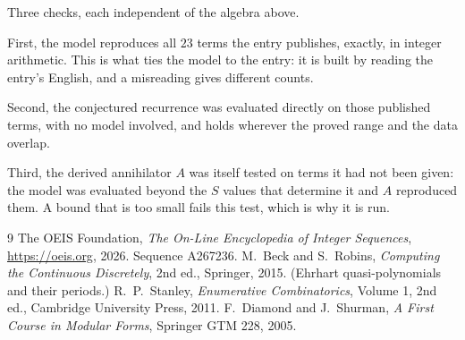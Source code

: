 \documentclass[11pt,a4paper]{article}
\theoremstyle{plain}
\theoremstyle{definition}
\begin{document}
Three checks, each independent of the algebra above.

First, the model reproduces all $23$ terms the entry publishes, exactly, in integer
arithmetic. This is what ties the model to the entry: it is built by reading the entry's
English, and a misreading gives different counts.

Second, the conjectured recurrence was evaluated directly on those published terms, with no
model involved, and holds wherever the proved range and the data overlap.

Third, the derived annihilator $A$ was itself tested on terms it had not been given: the model
was evaluated beyond the $S$ values that determine it and $A$ reproduced them. A bound that is
too small fails this test, which is why it is run.

\begin{thebibliography}{9}
 The OEIS Foundation, \emph{The On-Line Encyclopedia of Integer
Sequences}, \url{https://oeis.org}, 2026. Sequence A267236.
 M.~Beck and S.~Robins, \emph{Computing the Continuous Discretely},
2nd ed., Springer, 2015. (Ehrhart quasi-polynomials and their periods.)
 R.~P.~Stanley, \emph{Enumerative Combinatorics}, Volume 1, 2nd ed.,
Cambridge University Press, 2011.
 F.~Diamond and J.~Shurman, \emph{A First Course in Modular Forms},
Springer GTM 228, 2005.
\end{thebibliography}
\end{document}
